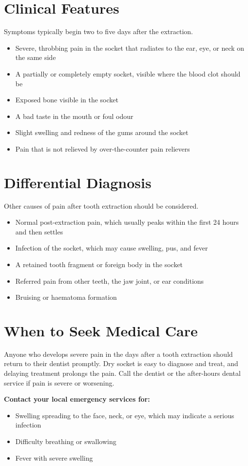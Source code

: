 \section*{Clinical Features}
Symptoms typically begin two to five days after the extraction.
\begin{itemize}
    \item Severe, throbbing pain in the socket that radiates to the ear, eye, or neck on the same side
    \item A partially or completely empty socket, visible where the blood clot should be
    \item Exposed bone visible in the socket
    \item A bad taste in the mouth or foul odour
    \item Slight swelling and redness of the gums around the socket
    \item Pain that is not relieved by over-the-counter pain relievers
\end{itemize}

\section*{Differential Diagnosis}
Other causes of pain after tooth extraction should be considered.
\begin{itemize}
    \item Normal post-extraction pain, which usually peaks within the first 24 hours and then settles
    \item Infection of the socket, which may cause swelling, pus, and fever
    \item A retained tooth fragment or foreign body in the socket
    \item Referred pain from other teeth, the jaw joint, or ear conditions
    \item Bruising or haematoma formation
\end{itemize}

\section*{When to Seek Medical Care}
Anyone who develops severe pain in the days after a tooth extraction should return to their dentist promptly. Dry socket is easy to diagnose and treat, and delaying treatment prolongs the pain. Call the dentist or the after-hours dental service if pain is severe or worsening.

\textbf{Contact your local emergency services for:}
\begin{itemize}
    \item Swelling spreading to the face, neck, or eye, which may indicate a serious infection
    \item Difficulty breathing or swallowing
    \item Fever with severe swelling
\end{itemize}

